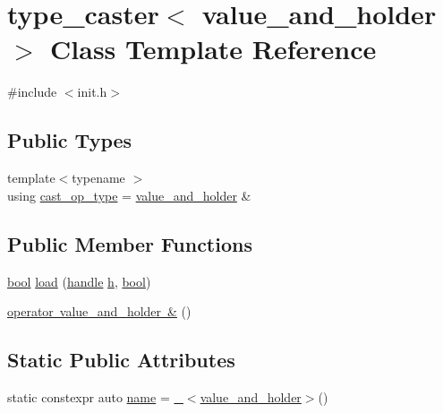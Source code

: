 \hypertarget{classtype__caster_3_01value__and__holder_01_4}{}\section{type\+\_\+caster$<$ value\+\_\+and\+\_\+holder $>$ Class Template Reference}
\label{classtype__caster_3_01value__and__holder_01_4}


{\ttfamily \#include $<$init.\+h$>$}

\subsection*{Public Types}
\begin{DoxyCompactItemize}
\item 
{\footnotesize template$<$typename $>$ }\\using \mbox{\hyperlink{classtype__caster_3_01value__and__holder_01_4_a5c9c81f541cb624915bd7449ba03d328}{cast\+\_\+op\+\_\+type}} = \mbox{\hyperlink{structvalue__and__holder}{value\+\_\+and\+\_\+holder}} \&
\end{DoxyCompactItemize}
\subsection*{Public Member Functions}
\begin{DoxyCompactItemize}
\item 
\mbox{\hyperlink{asdl_8h_af6a258d8f3ee5206d682d799316314b1}{bool}} \mbox{\hyperlink{classtype__caster_3_01value__and__holder_01_4_a5b60eb7d7cd457c62e8ba6aacd4c97c2}{load}} (\mbox{\hyperlink{classhandle}{handle}} \mbox{\hyperlink{_s_d_l__opengl__glext_8h_afa0fb1b5e976920c0abeff2dca3ed774}{h}}, \mbox{\hyperlink{asdl_8h_af6a258d8f3ee5206d682d799316314b1}{bool}})
\item 
\mbox{\hyperlink{classtype__caster_3_01value__and__holder_01_4_ab6c68773e5a599518b14f0fe8eee0f08}{operator value\+\_\+and\+\_\+holder \&}} ()
\end{DoxyCompactItemize}
\subsection*{Static Public Attributes}
\begin{DoxyCompactItemize}
\item 
static constexpr auto \mbox{\hyperlink{classtype__caster_3_01value__and__holder_01_4_ab64ece6aa46f12ba98a582098f12b7b7}{name}} = \mbox{\hyperlink{descr_8h_af114703e20c6527e87163eb2798f74b8}{\+\_\+}}$<$\mbox{\hyperlink{structvalue__and__holder}{value\+\_\+and\+\_\+holder}}$>$()
\end{DoxyCompactItemize}


